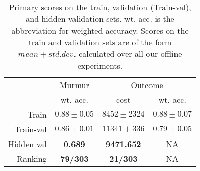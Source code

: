 
\begin{table}[!htp]
\centering
\begin{tabular}{r|c|c|c}
    \hline
    & Murmur & \multicolumn{2}{c}{Outcome} \\
    & wt. acc. & \multicolumn{1}{c}{cost} & \multicolumn{1}{c}{wt. acc.} \\ \hline
    Train & $0.88\pm 0.05$ & $8452\pm 2324$ & $0.88\pm 0.07$ \\
    Train-val & $0.86\pm 0.01$ & $11341\pm 336$ & $0.79\pm 0.05$ \\ \hline
    Hidden val & \textbf{0.689} & \textbf{9471.652} & NA \\
    Ranking & \textbf{79/303} & \textbf{21/303} & NA \\ \hline
\end{tabular}
\caption{Primary scores on the train, validation (Train-val), and hidden validation sets. wt. acc. is the abbreviation for weighted accuracy. Scores on the train and validation sets are of the form $mean \pm std. dev.$ calculated over all our offline experiments.}
\label{tab:challenge_scores}
\end{table}
